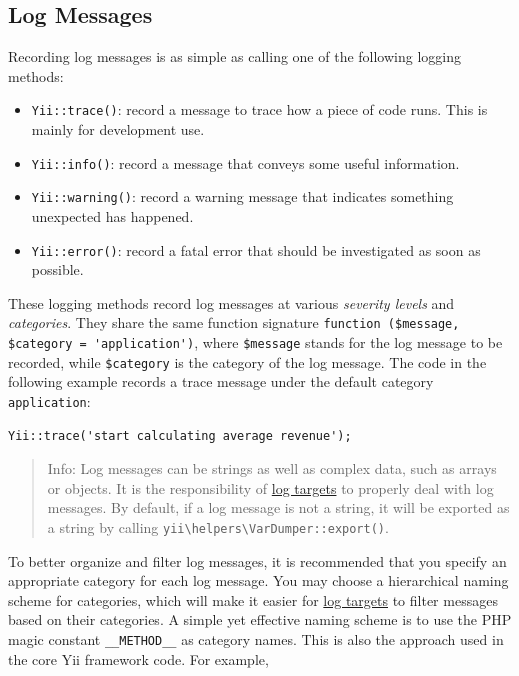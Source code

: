 \subsection{Log Messages \label{runtime-logging.md::log-messages}}
Recording log messages is as simple as calling one of the following logging methods:

\begin{itemize}
\item \texttt{Yii\allowbreak{}::\allowbreak{}trace()}: record a message to trace how a piece of code runs. This is mainly for development use.
\item \texttt{Yii\allowbreak{}::\allowbreak{}info()}: record a message that conveys some useful information.
\item \texttt{Yii\allowbreak{}::\allowbreak{}warning()}: record a warning message that indicates something unexpected has happened.
\item \texttt{Yii\allowbreak{}::\allowbreak{}error()}: record a fatal error that should be investigated as soon as possible.
\end{itemize}
These logging methods record log messages at various \textit{severity levels} and \textit{categories}. They share
the same function signature \lstinline|function ($message, $category = 'application')|, where \lstinline|$message| stands for
the log message to be recorded, while \lstinline|$category| is the category of the log message. The code in the following
example records a trace message under the default category \lstinline|application|:

\lstset{language=php}\begin{lstlisting}
Yii::trace('start calculating average revenue');
\end{lstlisting}
\begin{quote}Info: Log messages can be strings as well as complex data, such as arrays or objects. It is the responsibility
of \hyperref[runtime-logging.md::::log-targets]{log targets} to properly deal with log messages. By default, if a log message is not a string,
it will be exported as a string by calling \texttt{yii{\allowbreak{}\textbackslash}helpers{\allowbreak{}\textbackslash}VarDumper\allowbreak{}::\allowbreak{}export()}.

\end{quote}
To better organize and filter log messages, it is recommended that you specify an appropriate category for each
log message. You may choose a hierarchical naming scheme for categories, which will make it easier for 
\hyperref[runtime-logging.md::::log-targets]{log targets} to filter messages based on their categories. A simple yet effective naming scheme
is to use the PHP magic constant \lstinline|__METHOD__| as category names. This is also the approach used in the core 
Yii framework code. For example,

